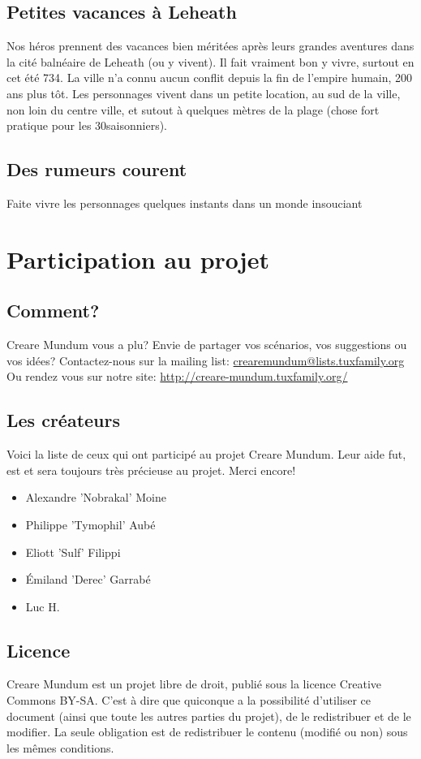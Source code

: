 \documentclass[a4paper]{article}
\begin{document}
\subsection{Petites vacances à Leheath}
Nos héros prennent des vacances bien méritées après leurs grandes aventures dans la cité balnéaire de Leheath (ou y vivent). 
Il fait vraiment bon y vivre, surtout en cet été 734. La ville n'a connu aucun conflit depuis la fin de l'empire humain, 200 ans plus tôt.
\newline
Les personnages vivent dans un petite location, au sud de la ville, non loin du centre ville, et sutout à quelques mètres de la plage (chose fort pratique pour les 30\degre saisonniers).
\subsection{Des rumeurs courent}
Faite vivre les personnages quelques instants dans un monde insouciant


\newpage
\section{Participation au projet}
\subsection{Comment?}
\hypertarget{participation}{}
Creare Mundum vous a plu? 
Envie de partager vos scénarios, vos suggestions ou vos idées?
\newline
Contactez-nous sur la mailing list: \href {mailto:crearemundum@lists.tuxfamily.org}{crearemundum@lists.tuxfamily.org}
\newline
Ou rendez vous sur notre site: \href {http://creare-mundum.tuxfamily.org/} {http://creare-mundum.tuxfamily.org/}
\subsection{Les créateurs}
Voici la liste de ceux qui ont participé au projet Creare Mundum. Leur aide fut, est et sera toujours très précieuse au projet. Merci encore!  
\begin{itemize}
\item Alexandre ’Nobrakal’ Moine 
\item Philippe ’Tymophil’ Aubé 
\item Eliott ’Sulf’ Filippi
\item Émiland ’Derec’ Garrabé
\item Luc H.
\end{itemize}
\subsection{Licence}
Creare Mundum est un projet libre de droit, publié sous la licence Creative Commons BY-SA. C'est à dire que quiconque a la possibilité d'utiliser ce document (ainsi que toute les autres parties du projet), de le redistribuer et de le modifier. La seule obligation est de redistribuer le contenu (modifié ou non) sous les mêmes conditions.
\end{document}

